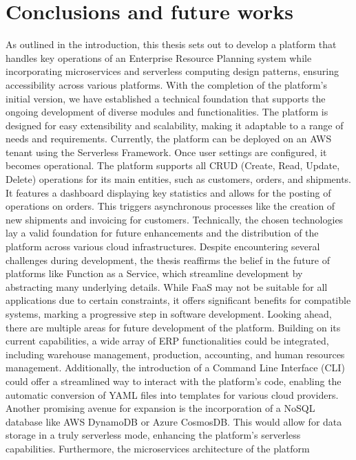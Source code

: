 \chapter{Conclusions and future works}
As outlined in the introduction, this thesis sets out to develop a platform that handles key
operations of an Enterprise Resource Planning system while incorporating microservices and
serverless computing design patterns, ensuring accessibility across various platforms. With the
completion of the platform's initial version, we have established a technical foundation that
supports the ongoing development of diverse modules and functionalities. The platform is designed
for easy extensibility and scalability, making it adaptable to a range of needs and requirements.
Currently, the platform can be deployed on an AWS tenant using the Serverless Framework. Once user
settings are configured, it becomes operational. The platform supports all CRUD (Create, Read,
Update, Delete) operations for its main entities, such as customers, orders, and shipments. It
features a dashboard displaying key statistics and allows for the posting of operations on orders.
This triggers asynchronous processes like the creation of new shipments and invoicing for customers.
Technically, the chosen technologies lay a valid foundation for future enhancements and the
distribution of the platform across various cloud infrastructures. Despite encountering several
challenges during development, the thesis reaffirms the belief in the future of platforms like
Function as a Service, which streamline development by abstracting many underlying details. While
FaaS may not be suitable for all applications due to certain constraints, it offers significant
benefits for compatible systems, marking a progressive step in software development.
\newline\newline
Looking ahead, there are multiple areas for future development of the platform. Building on its
current capabilities, a wide array of ERP functionalities could be integrated, including warehouse
management, production, accounting, and human resources management. Additionally, the introduction
of a Command Line Interface (CLI) could offer a streamlined way to interact with the platform’s
code, enabling the automatic conversion of YAML files into templates for various cloud providers.
Another promising avenue for expansion is the incorporation of a NoSQL database like AWS DynamoDB or
Azure CosmosDB. This would allow for data storage in a truly serverless mode, enhancing the
platform’s serverless capabilities. Furthermore, the microservices architecture of the platform
